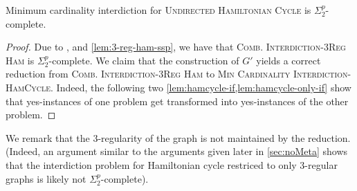 \begin{theorem}
\label{thm:ham-cycle-interdiction}
Minimum cardinality interdiction for \textsc{Undirected Hamiltonian Cycle} is $\Sigma^p_2$-complete.
\end{theorem}
\begin{proof}
Due to \cite{gruene2024completeness}, and \cref{lem:3-reg-ham-ssp}, we have that \textsc{Comb. Interdiction-3Reg Ham} is $\Sigma^p_2$-complete.
We claim that the construction of $G'$ yields a correct reduction from \textsc{Comb. Interdiction-3Reg Ham} to \textsc{Min Cardinality Interdiction-HamCycle}.
Indeed, the following two \cref{lem:hamcycle-if,lem:hamcycle-only-if} show that yes-instances of one problem get transformed into yes-instances of the other problem. 
\end{proof}
We remark that the 3-regularity of the graph is not maintained by the reduction.
(Indeed, an argument similar to the arguments given later in \cref{sec:noMeta} shows that the interdiction problem for Hamiltonian cycle restriced to only 3-regular graphs is likely not $\Sigma^p_2$-complete).

